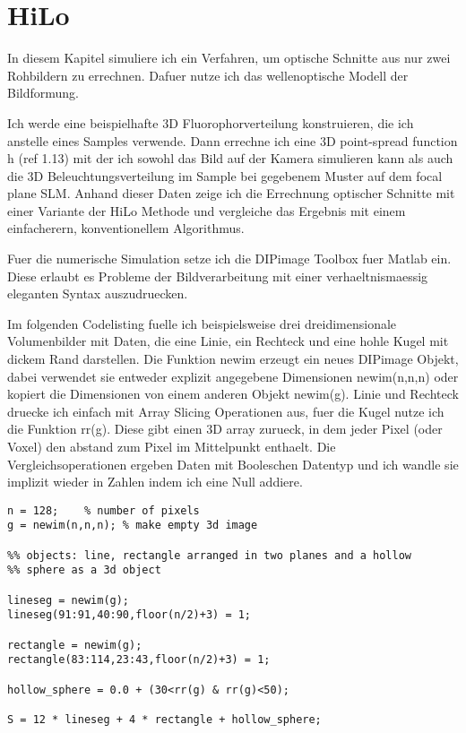 \section{HiLo}

In diesem Kapitel simuliere ich ein Verfahren, um optische Schnitte
aus nur zwei Rohbildern zu errechnen. Dafuer nutze ich das
wellenoptische Modell der Bildformung.

Ich werde eine beispielhafte 3D Fluorophorverteilung konstruieren,
die ich anstelle eines Samples verwende. Dann errechne ich eine 3D
point-spread function h (ref 1.13) mit der ich sowohl das Bild auf
der Kamera simulieren kann als auch die 3D Beleuchtungsverteilung im
Sample bei gegebenem Muster auf dem focal plane SLM. Anhand dieser
Daten zeige ich die Errechnung optischer Schnitte mit einer Variante
der HiLo Methode und vergleiche das Ergebnis mit einem einfacherern,
konventionellem Algorithmus.

Fuer die numerische Simulation setze ich die DIPimage Toolbox fuer
Matlab ein. Diese erlaubt es Probleme der Bildverarbeitung mit einer
verhaeltnismaessig eleganten Syntax auszudruecken. 

 Im folgenden Codelisting fuelle ich
beispielsweise drei dreidimensionale Volumenbilder mit Daten, die eine
Linie, ein Rechteck und eine hohle Kugel mit dickem Rand
darstellen. Die Funktion newim erzeugt ein neues DIPimage Objekt,
dabei verwendet sie entweder explizit angegebene Dimensionen
newim(n,n,n) oder kopiert die Dimensionen von einem anderen Objekt
newim(g). Linie und Rechteck druecke ich einfach mit Array Slicing
Operationen aus, fuer die Kugel nutze ich die Funktion rr(g). Diese
gibt einen 3D array zurueck, in dem jeder Pixel (oder Voxel) den
abstand zum Pixel im Mittelpunkt enthaelt. Die Vergleichsoperationen
ergeben Daten mit Booleschen Datentyp und ich wandle sie implizit
wieder in Zahlen indem ich eine Null addiere.

\begin{lstlisting}[style=mymatlab]
n = 128;    % number of pixels 
g = newim(n,n,n); % make empty 3d image

%% objects: line, rectangle arranged in two planes and a hollow
%% sphere as a 3d object

lineseg = newim(g);
lineseg(91:91,40:90,floor(n/2)+3) = 1;

rectangle = newim(g);
rectangle(83:114,23:43,floor(n/2)+3) = 1;

hollow_sphere = 0.0 + (30<rr(g) & rr(g)<50); 

S = 12 * lineseg + 4 * rectangle + hollow_sphere;
\end{lstlisting}

